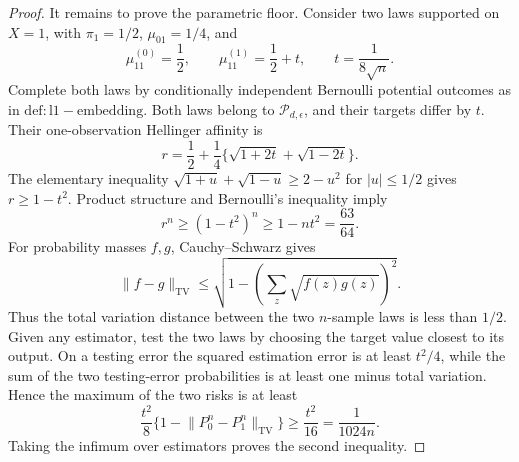 \documentclass{article}
\begin{document}
\begin{proof}
It remains to prove the parametric floor.  Consider two laws supported on \(X=1\), with \(\pi_1=1/2\), \(\mu_{01}=1/4\), and
\[
 \mu_{11}^{(0)}=\frac12,
 \qquad
 \mu_{11}^{(1)}=\frac12+t,
 \qquad
 t=\frac{1}{8\sqrt n}.
\]
Complete both laws by conditionally independent Bernoulli potential outcomes as in \(\mathrm{def:l1-embedding}\).  Both laws belong to \(\mathcal P_{d,\epsilon}\), and their targets differ by \(t\).  Their one-observation Hellinger affinity is
\[
 r=\frac12+\frac14\{\sqrt{1+2t}+\sqrt{1-2t}\}.
\]
The elementary inequality
\(\sqrt{1+u}+\sqrt{1-u}\ge2-u^2\) for \(\lvert u\rvert\le1/2\) gives \(r\ge1-t^2\).  Product structure and Bernoulli's inequality imply
\[
 r^n\ge(1-t^2)^n\ge1-nt^2=\frac{63}{64}.
\]
For probability masses \(f,g\), Cauchy--Schwarz gives
\[
 \lVert f-g\rVert_{\mathrm{TV}}
 \le\sqrt{1-\left(\sum_z\sqrt{f(z)g(z)}\right)^2}.
\]
Thus the total variation distance between the two \(n\)-sample laws is less than \(1/2\).  Given any estimator, test the two laws by choosing the target value closest to its output.  On a testing error the squared estimation error is at least \(t^2/4\), while the sum of the two testing-error probabilities is at least one minus total variation.  Hence the maximum of the two risks is at least
\[
 \frac{t^2}{8}\{1-\lVert P_0^n-P_1^n\rVert_{\mathrm{TV}}\}
 \ge\frac{t^2}{16}
 =\frac{1}{1024n}.
\]
Taking the infimum over estimators proves the second inequality.
\end{proof}
\end{document}
